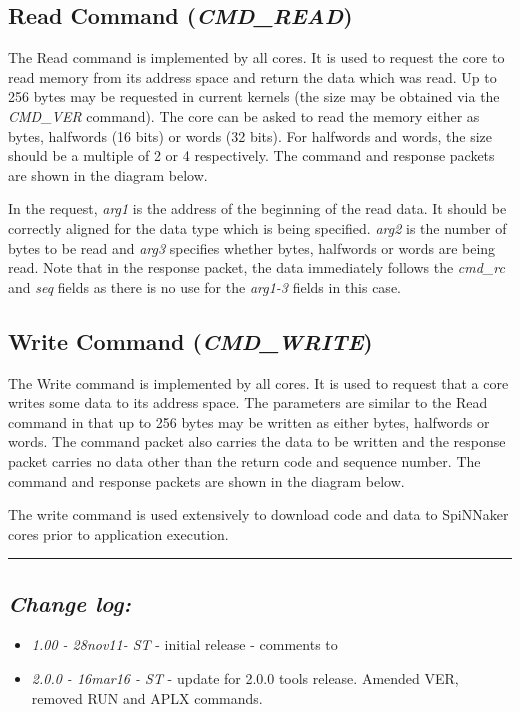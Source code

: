 \subsection{Read Command ({\em CMD\_READ})}

The Read command is implemented by all cores. It is used to request
the core to read memory from its address space and return the data
which was read. Up to 256 bytes may be requested in current kernels
(the size may be obtained via the {\em CMD\_VER} command). The core
can be asked to read the memory either as bytes, halfwords (16 bits)
or words (32 bits). For halfwords and words, the size should be a
multiple of 2 or 4 respectively. The command and response packets are
shown in the diagram below.


In the request, {\em arg1} is the address of the beginning of the read
data. It should be correctly aligned for the data type which is being
specified. {\em arg2} is the number of bytes to be read and {\em arg3}
specifies whether bytes, halfwords or words are being read. Note that
in the response packet, the data immediately follows the {\em cmd\_rc}
and {\em seq} fields as there is no use for the {\em arg1-3} fields in
this case.

\subsection{Write Command ({\em CMD\_WRITE})}

The Write command is implemented by all cores. It is used to request
that a core writes some data to its address space. The parameters are
similar to the Read command in that up to 256 bytes may be written as
either bytes, halfwords or words. The command packet also carries the
data to be written and the response packet carries no data other than
the return code and sequence number. The command and response packets
are shown in the diagram below.


The write command is used extensively to download code and data to
SpiNNaker cores prior to application execution.

\rule{\linewidth}{1pt}

\subsection{\itshape Change log:}

\begin{itemize}
\item {\itshape 1.00 - 28nov11- ST} - initial release - comments to
  {\itshape \Email}
\item {\itshape 2.0.0 - 16mar16 - ST} - update for 2.0.0 tools release.
Amended VER, removed RUN and APLX commands.
\end{itemize}


